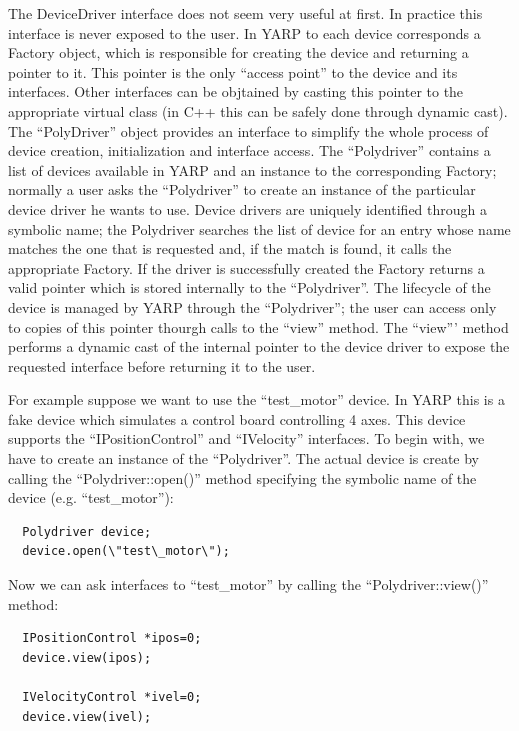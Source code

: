 The DeviceDriver interface does not seem very useful at first. In practice this 
interface is never exposed to the user. In YARP to each device corresponds a 
Factory object, which is responsible for creating the device and returning a 
pointer to it. This pointer is the only ``access point'' to the device and 
its interfaces. Other interfaces can be objtained by casting this pointer to the 
appropriate virtual class (in C++ this can be safely done through dynamic cast). 
The ``PolyDriver'' object 
provides an interface to simplify the whole process of device creation, 
initialization and interface access. The ``Polydriver'' contains a list of devices 
available in YARP and an instance to the corresponding Factory; normally a
user asks the ``Polydriver'' to create an instance of the particular device driver
he wants to use. Device drivers are uniquely identified through a symbolic name; 
the Polydriver searches the list of device for an entry whose name matches the 
one that is requested and, if the match is found, it calls the appropriate 
Factory. If the driver is successfully created the Factory returns a valid pointer 
which is stored internally to the ``Polydriver''. The lifecycle of the device is
managed by YARP through the ``Polydriver''; the user can access only to copies of this
pointer thourgh calls to the ``view'' method. The ``view''' method performs 
a dynamic cast of the internal pointer to the device driver to expose the requested
interface before returning it to the user.

For example suppose we want to use the ``test\_motor'' device. In YARP this 
is a fake device which simulates a control board controlling 4 axes. This device 
supports the ``IPositionControl'' and ``IVelocity'' interfaces. To begin with, we have 
to create an instance of the ``Polydriver''. The actual device is create 
by calling the ``Polydriver::open()'' method specifying the symbolic name of the 
device (e.g. ``test\_motor''):

\begin{verbatim}
  Polydriver device;
  device.open(\"test\_motor\");
\end{verbatim}

Now we can ask interfaces to ``test\_motor'' by calling the ``Polydriver::view()'' 
method:

\begin{verbatim}
  IPositionControl *ipos=0;
  device.view(ipos);

  IVelocityControl *ivel=0;
  device.view(ivel);
\end{verbatim}

